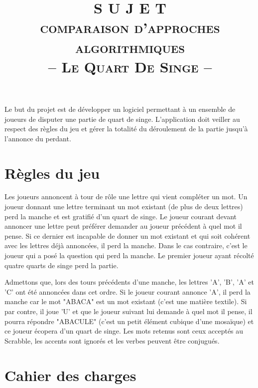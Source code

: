 \documentclass[10pt,a4paper,oneside]{article}
\begin{document}
\date{}
\author{}
\title{
    \vspace{-1.5cm}
    S U J E T\\
    {\Large \textsc{comparaison d'approches algorithmiques}}\\
    \vspace{3 mm}
    {\Large -- \textsc{Le Quart De Singe} --}\\
}

\maketitle

\vspace{-1.5cm}

Le but du projet est de développer un logiciel permettant à un ensemble de joueurs de disputer une partie de quart de singe. L'application doit veiller au respect des règles du jeu et gérer la totalité du déroulement de la partie jusqu'à l'annonce du perdant. 

\section{Règles du jeu}

Les joueurs annoncent à tour de rôle une lettre qui vient compléter un mot. Un joueur donnant une lettre terminant un mot existant (de plus de deux lettres) perd la manche et est gratifié d'un quart de singe. Le joueur courant devant annoncer une lettre peut préférer demander au joueur précédent à quel mot il pense. Si ce dernier est incapable de donner un mot existant et qui soit cohérent avec les lettres déjà annoncées, il perd la manche. Dans le cas contraire, c'est le joueur qui a posé la question qui perd la manche. Le premier joueur ayant récolté quatre quarts de singe perd la partie. 

\medskip

Admettons que, lors des tours précédents d'une manche, les lettres 'A', 'B', 'A' et 'C' ont été annoncées dans cet ordre. Si le joueur courant annonce 'A', il perd la manche car le mot "ABACA" est un mot existant (c'est une matière textile). Si par contre, il joue 'U' et que le joueur suivant lui demande à quel mot il pense, il pourra répondre "ABACULE" (c'est un petit élément cubique d'une mosaïque) et ce joueur écopera d'un quart de singe. Les mots retenus sont ceux acceptés au Scrabble, les accents sont ignorés et les verbes peuvent être conjugués.

\section{Cahier des charges}
\end{document}
